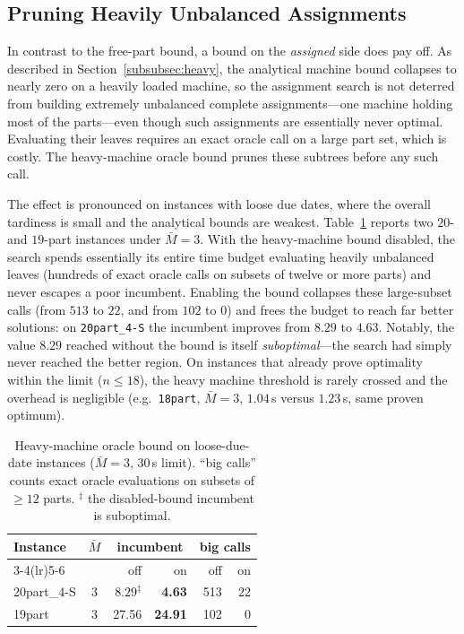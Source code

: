 \documentclass[review,3p,times,authoryear]{elsarticle}
\begin{document}
\subsection{Pruning Heavily Unbalanced Assignments}
\label{subsec:res_heavy}

In contrast to the free-part bound, a bound on the \emph{assigned} side does pay
off. As described in Section~\ref{subsubsec:heavy}, the analytical machine bound
collapses to nearly zero on a heavily loaded machine, so the assignment search is
not deterred from building extremely unbalanced complete assignments---one
machine holding most of the parts---even though such assignments are essentially
never optimal. Evaluating their leaves requires an exact oracle call on a large
part set, which is costly. The heavy-machine oracle bound prunes these subtrees
before any such call.

The effect is pronounced on instances with loose due dates, where the overall
tardiness is small and the analytical bounds are weakest. Table~\ref{tab:heavy}
reports two $20$- and $19$-part instances under $\bar M=3$. With the heavy-machine
bound disabled, the search spends essentially its entire time budget evaluating
heavily unbalanced leaves (hundreds of exact oracle calls on subsets of twelve or
more parts) and never escapes a poor incumbent. Enabling the bound collapses these
large-subset calls (from $513$ to $22$, and from $102$ to $0$) and frees the
budget to reach far better solutions: on \texttt{20part\_4-S} the incumbent
improves from $8.29$ to $4.63$. Notably, the value $8.29$ reached without the
bound is itself \emph{suboptimal}---the search had simply never reached the better
region. On instances that already prove optimality within the limit ($n\le 18$),
the heavy machine threshold is rarely crossed and the overhead is negligible
(e.g.\ \texttt{18part}, $\bar M=3$, $1.04$\,s versus $1.23$\,s, same proven
optimum).

\begin{table}[t]
	\centering
	\caption{Heavy-machine oracle bound on loose-due-date instances ($\bar M=3$,
		$30$\,s limit). ``big calls'' counts exact oracle evaluations on subsets of
		$\ge 12$ parts. $^\ddagger$ the disabled-bound incumbent is suboptimal.}
	\label{tab:heavy}
	\begin{tabular}{l c r r r r}
		\toprule
		\multirow{2}{*}{Instance} & \multirow{2}{*}{$\bar M$}
		& \multicolumn{2}{c}{incumbent} & \multicolumn{2}{c}{big calls} \\
		\cmidrule(lr){3-4}\cmidrule(lr){5-6}
		& & off & on & off & on \\
		\midrule
		20part\_4-S & 3 & $8.29^\ddagger$ & \textbf{4.63} & 513 & 22 \\
		19part      & 3 & 27.56           & \textbf{24.91} & 102 & 0  \\
		\bottomrule
	\end{tabular}
\end{table}
\end{document}
